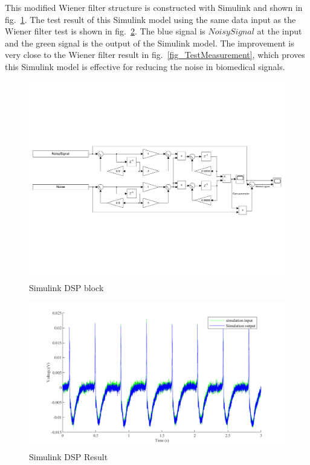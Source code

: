 This modified Wiener filter structure is constructed with Simulink and shown in fig.~\ref{fig_Simulink}.  The test result of this Simulink model using the same data input as the Wiener filter test is shown in fig.~\ref{fig_SimulinkResult}.  The blue signal is $NoisySignal$ at the input and the green signal is the output of the Simulink model.  The improvement is very close to the Wiener filter result in fig.~\ref{fig_TestMeasurement}, which proves this Simulink model is effective for reducing the noise in biomedical signals.

\begin{figure}[h]
\centering
\includegraphics[width=1\linewidth]{4-ANC_Sys/Simulink.pdf}
\caption{Simulink DSP block}
\label{fig_Simulink}
\end{figure}

\begin{figure}[h]
\centering
\includegraphics[width=1\linewidth]{4-ANC_Sys/SimulinkResult.pdf}
\caption{Simulink DSP Result}
\label{fig_SimulinkResult}
\end{figure}



